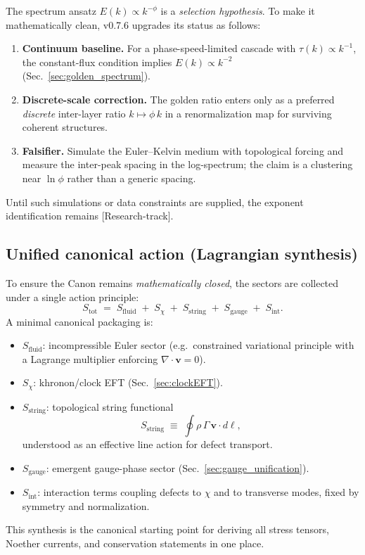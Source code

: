 \documentclass[10pt]{article}
\newcommand{\statusResearch}{\textsf{[Research-track]}}
\begin{document}
The spectrum ansatz $E(k)\propto k^{-\phi}$ is a \emph{selection hypothesis}.
To make it mathematically clean, v0.7.6 upgrades its status as follows:

\begin{enumerate}
\item \textbf{Continuum baseline.} For a phase-speed-limited cascade with $\tau(k)\propto k^{-1}$,
the constant-flux condition implies $E(k)\propto k^{-2}$ (Sec.~\ref{sec:golden_spectrum}).
\item \textbf{Discrete-scale correction.} The golden ratio enters only as a preferred \emph{discrete}
inter-layer ratio $k\mapsto \phi\,k$ in a renormalization map for surviving coherent structures.
\item \textbf{Falsifier.} Simulate the Euler--Kelvin medium with topological forcing and measure the
inter-peak spacing in the log-spectrum; the claim is a clustering near $\ln\phi$ rather than a
generic spacing.
\end{enumerate}

Until such simulations or data constraints are supplied, the exponent identification remains
\statusResearch.

\subsection{Unified canonical action (Lagrangian synthesis)}
\label{sec:unified_action_synthesis}

To ensure the Canon remains \emph{mathematically closed}, the sectors are collected under a single
action principle:
\begin{equation}
S_{\mathrm{tot}} \;=\; S_{\mathrm{fluid}} \;+\; S_{\chi} \;+\; S_{\mathrm{string}} \;+\; S_{\mathrm{gauge}} \;+\; S_{\mathrm{int}}.
\end{equation}
A minimal canonical packaging is:
\begin{itemize}
\item $S_{\mathrm{fluid}}$: incompressible Euler sector (e.g.\ constrained variational principle with a Lagrange multiplier enforcing $\nabla\cdot\mathbf{v}=0$).
\item $S_{\chi}$: khronon/clock EFT (Sec.~\ref{sec:clockEFT}).
\item $S_{\mathrm{string}}$: topological string functional
\begin{equation}
S_{\mathrm{string}}\;\equiv\;\oint \rho\,\Gamma\,\mathbf{v}\cdot d\boldsymbol{\ell},
\end{equation}
understood as an effective line action for defect transport.
\item $S_{\mathrm{gauge}}$: emergent gauge-phase sector (Sec.~\ref{sec:gauge_unification}).
\item $S_{\mathrm{int}}$: interaction terms coupling defects to $\chi$ and to transverse modes, fixed by symmetry and normalization.
\end{itemize}
This synthesis is the canonical starting point for deriving all stress tensors, Noether currents,
and conservation statements in one place.
\end{document}
